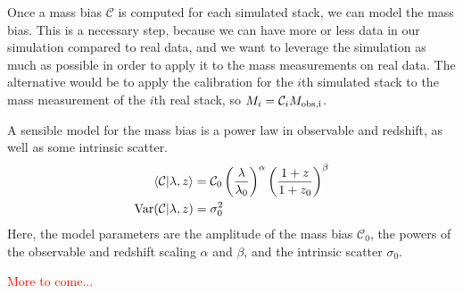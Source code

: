 \documentclass[12pt]{article}
\newcommand{\red}[1]{\textcolor{red}{#1}}
\begin{document}
Once a mass bias $\mathcal{C}$ is computed for each simulated stack, we can model the mass bias. This is a necessary step, because we can have more or less data in our simulation compared to real data, and we want to leverage the simulation as much as possible in order to apply it to the mass measurements on real data. The alternative would be to apply the calibration for the $i$th simulated stack to the mass measurement of the $i$th real stack, so $M_{i} = \mathcal{C}_i M_{\rm obs,i}$.

A sensible model for the mass bias is a power law in observable and redshift, as well as some intrinsic scatter.
%
\begin{align}
	\label{eq:mass_bias_form}
	\langle \mathcal{C}|\lambda,z\rangle  & = \mathcal{C}_0\left(\frac{\lambda}{\lambda_0} \right)^\alpha \left(\frac{1+z}{1+z_0}\right)^\beta \\
	{\rm Var}(\mathcal{C}|\lambda,z) & = \sigma_0^2
\end{align}
%
Here, the model parameters are the amplitude of the mass bias $\mathcal{C}_0$, the powers of the observable and redshift scaling $\alpha$ and $\beta$, and the intrinsic scatter $\sigma_0$.

\noindent
\red{More to come...}
\end{document}

